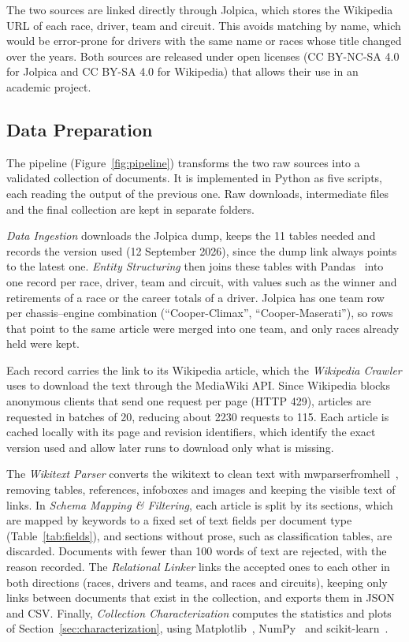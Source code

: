\documentclass[sigconf]{acmart}
\begin{document}
The two sources are linked directly through Jolpica, which stores the Wikipedia
URL of each race, driver, team and circuit. This avoids matching by name,
which would be error-prone for drivers with the same name or races whose
title changed over the years. Both sources are released under open licenses (CC
BY-NC-SA 4.0 for Jolpica and CC BY-SA 4.0 for Wikipedia) that allows their use in an academic project.

\subsection{Data Preparation}
\label{sec:pipeline}
The pipeline (Figure~\ref{fig:pipeline}) transforms the two raw sources into
a validated collection of documents. It is implemented in Python as five
scripts, each reading the output of the previous one. Raw downloads,
intermediate files and the final collection are kept in separate folders.

\textit{Data Ingestion} downloads the Jolpica dump, keeps the 11 tables needed
and records the version used (12 September 2026), since the dump link
always points to the latest one. \textit{Entity Structuring} then joins these tables
with Pandas~\cite{pandas} into one record per race, driver, team and
circuit, with values such as the winner and retirements of a race or the
career totals of a driver. Jolpica has one team row per chassis--engine
combination (``Cooper-Climax'', ``Cooper-Maserati''), so rows that point to
the same article were merged into one team, and only races already held
were kept.

Each record carries the link to its Wikipedia article, which the
\textit{Wikipedia Crawler} uses to download the text through the MediaWiki API. Since Wikipedia blocks anonymous
clients that send one request per page (HTTP 429), articles are requested
in batches of 20, reducing about 2230 requests to 115. Each article is
cached locally with its page and revision identifiers, which identify the
exact version used and allow later runs to download only what is missing.

The \textit{Wikitext Parser} converts the wikitext to clean text with mwparserfromhell~\cite{mwparserfromhell}, removing tables,
references, infoboxes and images and keeping the visible text of links.
In \textit{Schema Mapping \& Filtering}, each article is split by
its sections, which are mapped by keywords to a fixed set of text fields
per document type (Table~\ref{tab:fields}), and sections without prose,
such as classification tables, are discarded. Documents with
fewer than 100 words of text are rejected, with the reason recorded. The
\textit{Relational Linker} links the accepted ones to each other in both directions (races, drivers
and teams, and races and circuits), keeping only links between documents
that exist in the collection, and exports them in JSON and CSV. Finally,
\textit{Collection Characterization} computes the statistics and plots of
Section~\ref{sec:characterization}, using Matplotlib~\cite{matplotlib},
NumPy~\cite{numpy} and scikit-learn~\cite{scikitlearn}.
\end{document}
